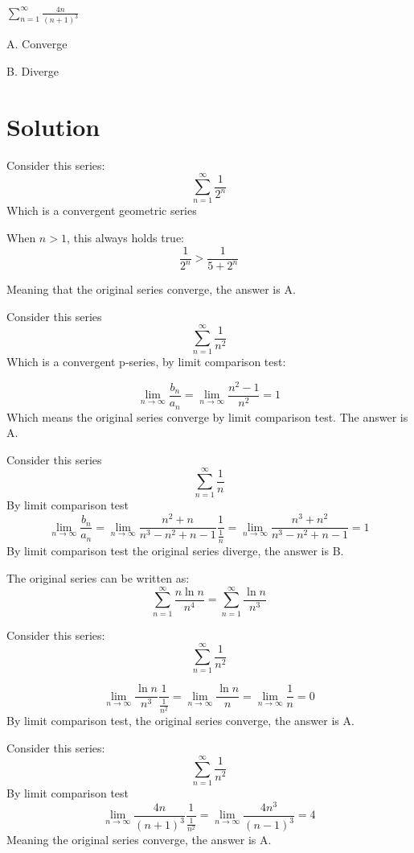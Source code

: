 \documentclass{article}
\numberwithin{equation}{section}
\begin{document}
$\displaystyle \sum_{n=1}^{\infty} \frac{4n}{(n+1)^3}$

A. Converge 

B. Diverge 

\section{Solution}

Consider this series:
\[
\sum_{n=1}^{\infty} \frac{1}{2^n}
\]
Which is a convergent geometric series

When $n>1$, this always holds true:
\[
\frac{1}{2^n} > \frac{1}{5+2^n}
\]

Meaning that the original series converge, the answer is A.

Consider this series
\[
\sum_{n=1}^{\infty} \frac{1}{n^2}
\]
Which is a convergent p-series, by limit comparison test:

\[
\lim_{n\to \infty} \frac{b_n}{a_n} = \lim_{n\to \infty} \frac{n^2-1}{n^2} = 1
\]
Which means the original series converge by limit comparison test. The answer is A.

Consider this series
\[
\sum_{n=1}^{\infty} \frac{1}{n}
\]
By limit comparison test
\[
\lim_{n\to \infty} \frac{b_n}{a_n} = \lim_{n\to \infty}\frac{n^2+n}{n^3 - n^2 + n -1} \frac{1}{\frac{1}{n}} = \lim_{n\to \infty}\frac{n^3+n^2}{n^3-n^2+n-1} = 1
\]
By limit comparison test the original series diverge, the answer is B.

The original series can be written as:
\[
\sum_{n=1}^{\infty} \frac{n\ln n}{n^4} = \sum_{n=1}^{\infty}\frac{\ln n}{n^3}
\]

Consider this series:
\[
\sum_{n=1}^{\infty} \frac{1}{n^2}
\]

\[
\lim_{n\to \infty} \frac{\ln n}{n^3} \frac{1}{\frac{1}{n^2}} = \lim_{n\to \infty} \frac{\ln n}{n} = \lim_{n\to \infty} \frac{1}{n} = 0
\]
By limit comparison test, the original series converge, the answer is A.

Consider this series:
\[
\sum_{n=1}^{\infty} \frac{1}{n^2}
\]
By limit comparison test
\[
\lim_{n\to \infty} \frac{4n}{(n+1)^3} \frac{1}{\frac{1}{n^2}} = \lim_{n\to \infty} \frac{4n^3}{(n-1)^3} = 4
\]
Meaning the original series converge, the answer is A.
\end{document}
